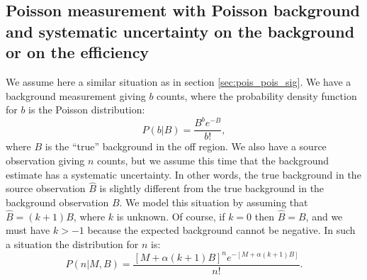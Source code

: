 \documentclass[twocolumn]{aastex61}
\begin{document}
\subsection{Poisson measurement with Poisson background and systematic uncertainty on the background or on the efficiency}
\label{sec:lima_sys}
We assume here a similar situation as in section \ref{sec:pois_pois_sig}. We have a background measurement giving $b$ counts, where the probability density function for $b$ is the Poisson distribution:
$$
P(b | B) = \frac{B^{b} e^{-B}}{b!},
$$
where $B$ is the ``true'' background in the off region. We also have a source observation giving $n$ counts, but we assume this time that the background estimate has a systematic uncertainty. In other words, the true background in the source observation $\hat{B}$ is slightly different from the true background in the background observation $B$. We model this situation by assuming that $\hat{B} = (k + 1) B$, where $k$ is unknown. Of course, if $k=0$ then $\hat{B} = B$, and we must have $k > -1$ because the expected background cannot be negative. In such a situation the distribution for $n$ is:
$$
P(n | M, B) = \frac{\left[M + \alpha (k + 1) B\right]^{n} e^{-\left[M + \alpha (k + 1) B\right]}}{n!}.
$$
\end{document}
